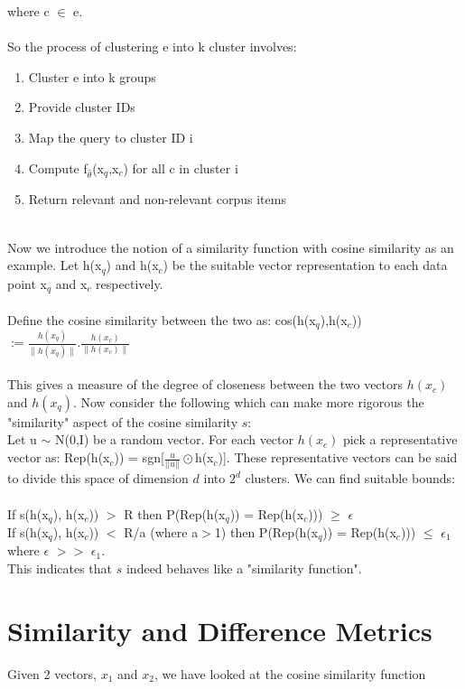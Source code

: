 \documentclass[11pt, twosides]{article}
\begin{document}
where c $\in$ e. \\~\\
So the process of clustering e into k cluster involves:
\begin{enumerate}
    \item Cluster e into k groups
    \item Provide cluster IDs
    \item Map the query to cluster ID i
    \item Compute f$_\hat{\theta}$(x$_q$,x$_c$) for all c in cluster i
    \item Return relevant and non-relevant corpus items
\end{enumerate}
\\
Now we introduce the notion of a similarity function with cosine similarity as an example. Let h(x$_q$) and h(x$_c$) be the suitable vector representation to each data point x$_q$ and x$_c$ respectively.\\~\\
Define the cosine similarity between the two as: 
cos(h(x$_q$),h(x$_c$)) $:=\frac{h(x_q)}{\|h(x_q)\|}.\frac{h(x_c)}{\|h(x_c)\|}$\\~\\
This gives a measure of the degree of closeness between the two vectors $h(x_c)$ and $h(x_q)$. Now consider the following which can make more rigorous the "similarity" aspect of the cosine similarity $s$:\\
Let u $\sim$ N(0,I) be a random vector.
For each vector $h(x_c)$ pick a representative vector as: Rep(h(x$_c$)) = sgn[$\frac{u}{||u||}\odot $h(x$_c$)]. These representative vectors can be said to divide this space of dimension $d$ into $2^d$ clusters. We can find suitable bounds: \\~\\
If s(h(x$_q$), h(x$_c$)) $>$ R  then P(Rep(h(x$_q$)) = Rep(h(x$_c$))) $\geq$ $\epsilon$ \\
If s(h(x$_q$), h(x$_c$)) $<$ R/a (where a$>$1)  then P(Rep(h(x$_q$)) = Rep(h(x$_c$))) $\leq$ $\epsilon$$_{1}$\\
where $\epsilon$ $>$$>$ $\epsilon_{1}$.\\
This indicates that $s$ indeed behaves like a "similarity function".

\section{Similarity and Difference Metrics}

Given 2 vectors, $x_1$ and $x_2$, we have looked at the cosine similarity function
\end{document}
